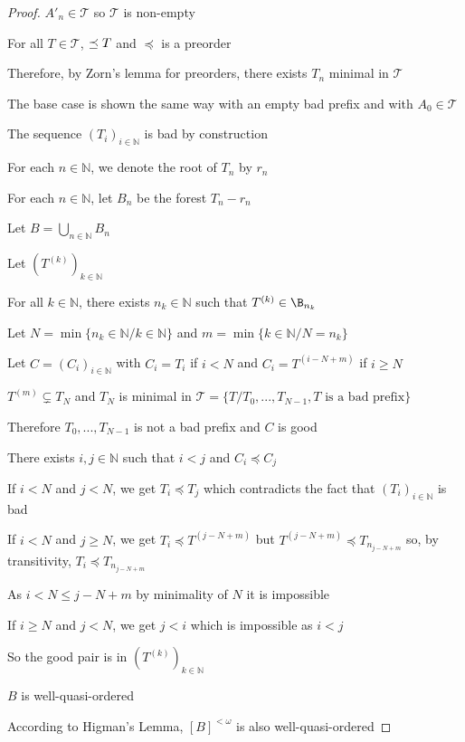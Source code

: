 \begin{proof}
  \(A'_n\in\mathcal{T}\) so \(\mathcal{T}\) is non-empty

  For all \(T\in\mathcal{T}\), \(\empty\preceq T\) and \(\preceq\) is a preorder

  Therefore, by Zorn's lemma for preorders, there exists \(T_n\) minimal in \(\mathcal{T}\)

  The base case is shown the same way with an empty bad prefix and with \(A_0\in\mathcal{T}\)

  The sequence \(\left(T_i\right)_{i\in\mathbb{N}}\) is bad by construction

  For each \(n\in\mathbb{N}\), we denote the root of \(T_n\) by \(r_n\)

  For each \(n\in\mathbb{N}\), let \(B_n\) be the forest \(T_n-r_n\)

  Let \(B=\displaystyle\bigcup_{n\in\mathbb{N}}B_n\)

  Let \(\left(T^{(k)}\right)_{k\in\mathbb{N}}\)

  For all \(k\in\mathbb{N}\), there exists \(n_k\in\mathbb{N}\) such that \(T^{(k)}\in\B_{n_k}\)

  Let \(N=\min\{n_k\in\mathbb{N}/k\in\mathbb{N}\}\) and \(m=\min\{k\in\mathbb{N}/N=n_k\}\)

  Let \(C=\left(C_i\right)_{i\in\mathbb{N}}\) with \(C_i=T_i\) if \(i<N\) and \(C_i=T^{(i-N+m)}\) if \(i\geq N\)

  \(T^{(m)}\subsetneq T_N\) and \(T_N\) is minimal in \(\mathcal{T}=\{T/T_0,...,T_{N-1},T\text{ is a bad prefix}\}\)

  Therefore \(T_0,...,T_{N-1}\) is not a bad prefix and \(C\) is good

  There exists \(i,j\in\mathbb{N}\) such that \(i<j\) and \(C_i\preceq C_j\)

  If \(i<N\) and \(j<N\), we get \(T_i\preceq T_j\) which contradicts the fact that \(\left(T_i\right)_{i\in\mathbb{N}}\) is bad

  If \(i<N\) and \(j\geq N\), we get \(T_i\preceq T^{(j-N+m)}\) but \(T^{(j-N+m)}\preceq T_{n_{j-N+m}}\) so, by transitivity, \(T_i\preceq T_{n_{j-N+m}}\)

  As \(i<N\leq j-N+m\) by minimality of \(N\) it is impossible

  If \(i\geq N\) and \(j<N\), we get \(j<i\) which is impossible as \(i<j\)

  So the good pair is in \(\left(T^{(k)}\right)_{k\in\mathbb{N}}\)

  \(B\) is well-quasi-ordered

  According to Higman's Lemma, \([B]^{<\omega}\) is also well-quasi-ordered


\end{proof}
